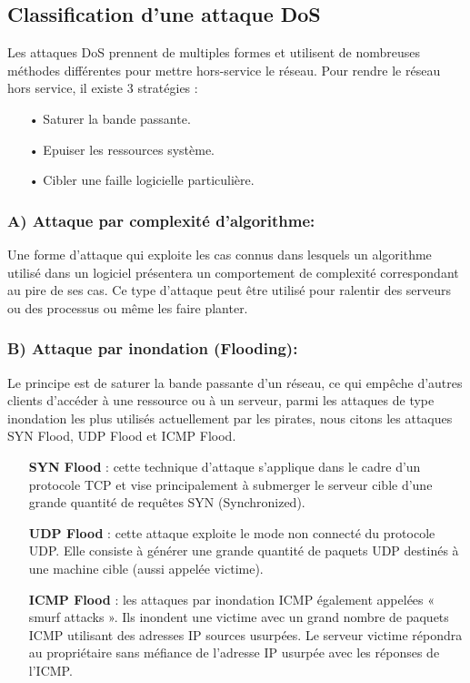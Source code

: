 \subsection{Classification d'une attaque DoS}
Les attaques DoS prennent de multiples formes et utilisent de nombreuses méthodes différentes pour mettre hors-service le réseau.
Pour rendre le réseau hors service, il existe 3 stratégies :\\
\begin{itemize}
\item[•]Saturer la bande passante.
\item[•]Epuiser les ressources système.
\item[•]Cibler une faille logicielle particulière.
\end{itemize} 

\subsubsection{A) Attaque par complexité d’algorithme:}
Une forme d’attaque qui exploite les cas connus dans lesquels un algorithme utilisé dans un logiciel présentera un comportement de complexité correspondant au pire de ses cas. Ce type d’attaque peut être utilisé pour ralentir des serveurs ou des processus ou même les faire planter. 
\subsubsection{B) Attaque par inondation (Flooding):}
Le principe est de saturer la bande passante d’un réseau, ce qui empêche d'autres clients d’accéder à une ressource ou à un serveur, parmi les attaques de type inondation les plus utilisés actuellement par les pirates, nous citons les attaques SYN Flood, UDP Flood et ICMP Flood.\\
\begin{itemize}
\item[\textbf{SYN Flood}]: cette technique d’attaque s’applique dans le cadre d’un protocole TCP et vise principalement à submerger le serveur cible d’une grande quantité de requêtes SYN (Synchronized).\\
\item[\textbf{UDP Flood}]: cette attaque exploite le mode non connecté du protocole UDP. Elle consiste à générer une grande quantité de paquets UDP destinés à une machine cible (aussi appelée victime).\\
\item[\textbf{ICMP Flood}]: les attaques par inondation ICMP également appelées « smurf attacks ». Ils inondent une victime avec un grand nombre de paquets ICMP utilisant des adresses IP sources usurpées. Le serveur victime répondra au propriétaire sans méfiance de l'adresse IP usurpée avec les réponses de l'ICMP.\\
\end{itemize}

